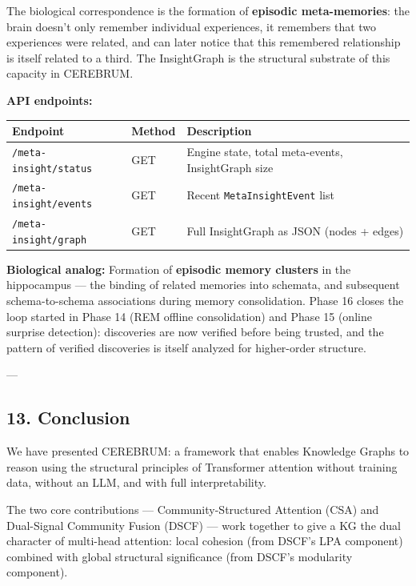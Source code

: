 \documentclass[10pt,journal,compsoc]{IEEEtran}
\begin{document}
The biological corre\-spondence is the formation of \textbf{episodic meta-memories}: the brain doesn't only remember individual experiences, it remembers that two experiences were related, and can later notice that this remembered relat\-ionship is itself related to a third. The InsightGraph is the structural substrate of this capacity in CEREBRUM.

\textbf{API endpoints:}

\begin{center}
{\footnotesize
\begin{tabularx}{\columnwidth}{|>{\raggedright\arraybackslash}X|>{\raggedright\arraybackslash}X|>{\raggedright\arraybackslash}X|}
\hline
Endpoint & Method & Description \\ \hline
\texttt{/meta-insight/status} & GET & Engine state, total meta-events, InsightGraph size \\ \hline
\texttt{/meta-insight/events} & GET & Recent \texttt{MetaInsightEvent} list \\ \hline
\texttt{/meta-insight/graph} & GET & Full InsightGraph as JSON (nodes + edges) \\ \hline
\end{tabularx}
}
\end{center}

\textbf{Biological analog:} Formation of \textbf{episodic memory clusters} in the hippocampus — the binding of related memories into schemata, and subsequent schema-to-schema assoc\-iations during memory conso\-lidation. Phase 16 closes the loop started in Phase 14 (REM offline conso\-lidation) and Phase 15 (online surprise detection): discoveries are now verified before being trusted, and the pattern of verified discoveries is itself analyzed for higher-order structure.

---

\subsection{13. Conclusion}

We have presented CEREBRUM: a framework that enables Knowledge Graphs to
reason using the structural principles of Transformer attention without
training data, without an LLM, and with full inter\-pretability.

The two core contr\-ibutions — Community-Structured Attention (CSA) and
Dual-Signal Community Fusion (DSCF) — work together to give a KG the dual
character of multi-head attention: local cohesion (from DSCF's LPA component)
combined with global structural signi\-ficance (from DSCF's modularity
component).
\end{document}
